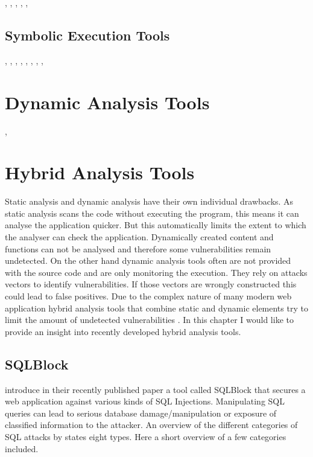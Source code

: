 \autocite[]{Chaudhuri2010}, \autocite[]{Near2014}, \autocite[]{Bocic2014}, \autocite[]{Munetoh2013a}, \autocite[]{Jovanovic2006}, \autocite[]{Munetoh2013}


\subsection{Symbolic Execution Tools}
\autocite[]{Chaudhuri2010}, \autocite[]{Near2014}, \autocite[]{Near2012}, \autocite[]{Nijjar2011}, \autocite[]{Near2016}, \autocite[]{Jackson2002}, \autocite[]{Bocic2016}, \autocite[]{Cadar2011}, \autocite[]{Bocic2014}


\section{Dynamic Analysis Tools}
\autocite[]{Yip2009}, \autocite[]{Felt2011}

\section{Hybrid Analysis Tools}
Static analysis and dynamic analysis have their own individual drawbacks. As static analysis scans the code without executing the program, this means it can analyse the application quicker. But this automatically limits the extent to which the analyser can check the application. Dynamically created content and functions can not be analysed and therefore some vulnerabilities remain undetected. On the other hand dynamic analysis tools often are not provided with the source code and are only monitoring the execution. They rely on attacks vectors to identify vulnerabilities. If those vectors are wrongly constructed this could lead to false positives.
Due to the complex nature of many modern web application hybrid analysis tools that combine static and dynamic elements try to limit the amount of undetected vulnerabilities \autocite[]{Araujo2018, Jahanshahi2018}. In this chapter I would like to provide an insight into recently developed hybrid analysis tools.

\subsection{SQLBlock}
\textcite[]{Jahanshahi2018} introduce in their recently published paper a tool called SQLBlock that secures a web application against various kinds of SQL Injections. Manipulating SQL queries can lead to serious database damage/manipulation or exposure of classified information to the attacker. An overview of the different categories of SQL attacks by \textcite[3ff.]{Halfond2008} states eight types. Here a short overview of a few categories included.\newline


